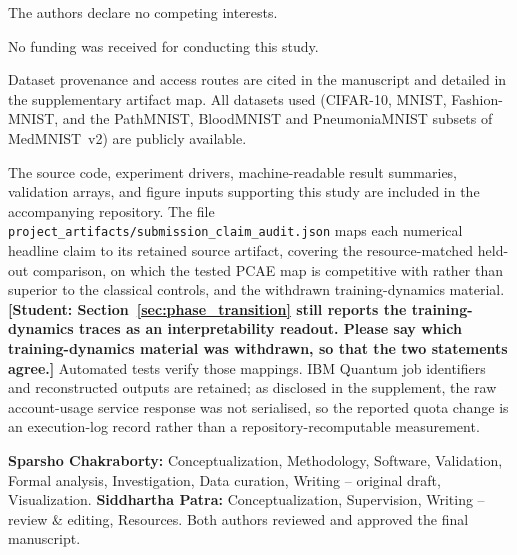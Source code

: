 \documentclass[pdflatex,sn-basic]{sn-jnl}
\begin{document}
\begin{description}\itemsep4pt
  \item[Competing interests.] The authors declare no competing interests.

  \item[Funding.] No funding was received for conducting this study.

  \item[Data availability.] Dataset provenance and access routes are cited in the
        manuscript and detailed in the supplementary artifact map. All datasets
        used (CIFAR-10, MNIST, Fashion-MNIST, and the PathMNIST, BloodMNIST and
        PneumoniaMNIST subsets of MedMNIST~v2) are publicly available.

  \item[Code availability.] The source code, experiment drivers,
        machine-readable result summaries, validation arrays, and figure inputs
        supporting this study are included in the accompanying repository. The
        file \texttt{project\_artifacts/submission\_claim\_audit.json} maps each
        numerical headline claim to its retained source artifact, covering the
        resource-matched held-out comparison, on which the tested PCAE map is
        competitive with rather than superior to the classical controls, and the
        withdrawn training-dynamics material. {\color{red}\textbf{[Student:
Section~\ref{sec:phase_transition} still reports the training-dynamics traces as
an interpretability readout. Please say which training-dynamics material was
withdrawn, so that the two statements agree.]}} Automated tests verify those
        mappings.
        IBM Quantum job identifiers and reconstructed outputs are retained; as
        disclosed in the supplement, the raw account-usage service response was
        not serialised, so the reported quota change is an execution-log record
        rather than a repository-recomputable measurement.

  \item[Author contributions.] \textbf{Sparsho Chakraborty:}
        Conceptualization, Methodology, Software, Validation, Formal analysis,
        Investigation, Data curation, Writing -- original draft, Visualization.
        \textbf{Siddhartha Patra:} Conceptualization, Supervision, Writing --
        review \& editing, Resources. Both authors reviewed and approved the
        final manuscript.
\end{description}

% 

\end{document}
